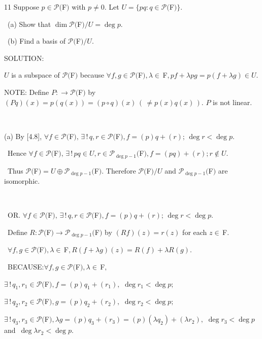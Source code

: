 \documentclass[a4paper, 11pt, UTF8]{article}
\def\Po{\mathcal{P}}
\def\Fbfc{$\,{\timesbf F}$}
\begin{document}
\begin{large}
{\timesbf\Large 11} {\timessl\Large 
Suppose $p\in\Po(${\timesbf F}$)$ with $p\neq 0$. Let $U=\{pq:q\in\Po(${\timesbf F}$)\}$.}\par\quad\,
(a) {\timessl\Large Show that $\dim\Po(${\timesbf F}$)/U = \deg p$.}\par\quad\,
(b) {\timessl\Large Find a basis of $\Po(${\timesbf F}$)/U$.
}\par
{\timesbf S\footnotesize{OLUTION:}}\par\quad
$U$ is a subspace of $\Po(${\timesbf F}$)$ because $\forall f,g\in\Po(${\timesbf F}$),\lambda\in\Fbfc,pf+\lambda pg=p(f+\lambda g)\in U.$\par\quad
N{\small OTE:} Define $P:\rightarrow\Po(${\timesbf F}$)$ by $(Pq)(x)=p(q(x))=(p\circ q)(x)\,(\,\neq p(x)q(x)\,).$ $P$ is not linear.\par{\tiny\,\par}\quad
(a) By [4.8], $\forall f\in\Po(${\timesbf F}$),\,\exists\,!\,q,r\in\Po(${\timesbf F}$),f=(p)q+(r);\,\deg r<\deg p.$\par\qquad\,
Hence $\forall f\in\Po(${\timesbf F}$),\,\exists\,!\,pq\in U,r\in\Po_{\deg p-1}(${\timesbf F}$),f=(pq)+(r); r\not\in U.$\par\qquad\,
Thus $\Po(${\timesbf F}$)=U\oplus\Po_{\deg p-1}(${\timesbf F}$).$ Therefore $\Po(${\timesbf F}$)/U$ and $\Po_{\deg p-1}(${\timesbf F}$)$ are isomorphic.\par{\tiny\,\par}\qquad\,
O{\small R.} $\forall f\in\Po(${\timesbf F}$),\,\exists\,!\,q,r\in\Po(${\timesbf F}$),f=(p)q+(r);\,\deg r<\deg p.$\par\qquad\,
Define $R:\Po(${\timesbf F}$)\rightarrow\Po_{\deg p-1}(${\timesbf F}$)$ by $(Rf)(z)=r(z)$ for each $z\in\Fbfc.$\par\qquad\,
$\forall f,g\in\Po(${\timesbf F}$),\lambda\in\Fbfc,R(f+\lambda g)(z)=R(f)+\lambda R(g).$\par\qquad\,
B{\small ECAUSE:}\small $\forall f,g\in\Po(${\timesbf F}$),\lambda\in\Fbfc,$\par\qquad\quad\qquad\qquad\quad
$\exists\,!\,q_1,r_1\in\Po(${\timesbf F}$),f=(p)q_1+(r_1),\,\,\deg r_1<\deg p;$\par\qquad\qquad\quad\qquad\quad
$\exists\,!\,q_2,r_2\in\Po(${\timesbf F}$),g=(p)q_2+(r_2),\,\,\deg r_2<\deg p;$\par\qquad\qquad\quad\qquad\quad
$\exists\,!\,q_3,r_3\in\Po(${\timesbf F}$),\lambda g=(p)q_3+(r_3)=(p)(\lambda q_2)+(\lambda r_2),\,\,\deg r_3<\deg p$ \,{\small and}\, $\deg \lambda r_2<\deg p.$\par\qquad\qquad\quad\,\,\,\qquad\qquad\qquad\quad\qquad\qquad

\end{large}
\end{document}
